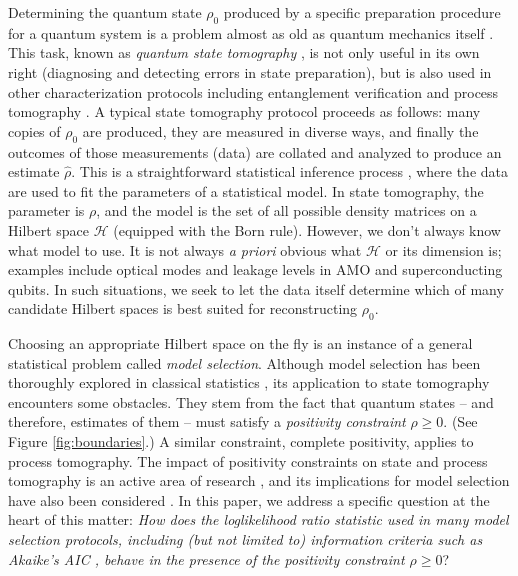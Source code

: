 \documentclass[aps,pra, twocolumn]{revtex4-1}
\newcommand{\cH}{\mathcal{H}}
\newcommand{\rhohat}{\hat{\rho}}
\begin{document}
Determining the quantum state $\rho_{0}$ produced by a specific preparation procedure for a quantum system is a problem almost as old as quantum mechanics itself \cite{Corbett2006, Pauli1933}. This task, known as \emph{quantum state tomography} \cite{Paris2004}, is not only useful in its own right (diagnosing and detecting errors in state preparation), but is also used in other characterization protocols including entanglement verification \cite{Steffen2006, Blume-Kohout2010c, VanEnk2007} and process tomography \cite{Anis2012}. A typical state tomography protocol proceeds as follows: many copies of $\rho_{0}$ are produced, they are measured in diverse ways, and finally the outcomes of those measurements (data) are collated and analyzed to produce an estimate $\rhohat$.  This is a straightforward statistical inference process \cite{Reid2015, Wasserman2004}, where the data are used to fit the parameters of a statistical model. In state tomography, the parameter is $\rho$, and the model is the set of all possible density matrices on a Hilbert space $\cH$ (equipped with the Born rule). However, we don't always know what model to use. It is not always \emph{a priori} obvious what $\cH$ or its dimension is; examples include optical modes \cite{Altepeter2005, Bertrand1987, Lvovsky2009, Breitenbach1997, Leonhardt1995} and leakage levels in AMO and superconducting \cite{Motzoi2009, Fazio1999} qubits. In such situations, we seek to let the data itself determine which of many candidate Hilbert spaces is best suited for reconstructing $\rho_{0}$.

Choosing an appropriate Hilbert space on the fly is an instance of a general statistical problem called \emph{model selection}.  Although model selection has been thoroughly explored in classical statistics \cite{Burnham2004}, its application to state tomography encounters some obstacles.  They stem from the fact that quantum states -- and therefore, estimates of them -- must satisfy a \emph{positivity constraint} $\rho\geq0$.  (See Figure \ref{fig:boundaries}.) A similar constraint, complete positivity, applies to process tomography.  The impact of positivity constraints on state and process tomography is an active area of research \cite{Candes2006, Flammia2012a, Suess2016, Carpentier2015}, and its implications for model selection have also been considered \cite{Schwarz2013a, Guta2012a, VanEnk2013a, Langford2013, Yin2011, Moroder2013, Knips2015}.  In this paper, we address a specific question at the heart of this matter:  \emph{How does the loglikelihood ratio statistic used in many model selection protocols, including (but not limited to) information criteria such as Akaike's AIC \cite{Akaike1974}, behave in the presence of the positivity constraint $\rho\geq0$}? 
\end{document}
